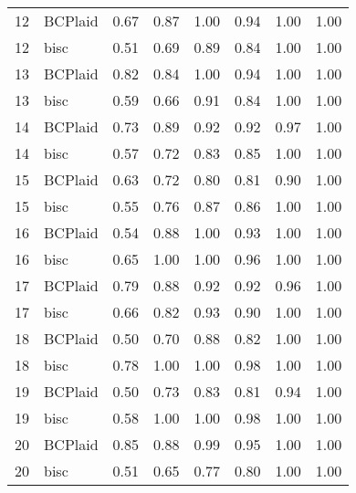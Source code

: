 \begin{table}[ht]
\begin{tabular}{rlrrrrrr}
   12 & BCPlaid & 0.67 & 0.87 & 1.00 & 0.94 & 1.00 & 1.00 \\ 
   12 & bisc & 0.51 & 0.69 & 0.89 & 0.84 & 1.00 & 1.00 \\ 
   13 & BCPlaid & 0.82 & 0.84 & 1.00 & 0.94 & 1.00 & 1.00 \\ 
   13 & bisc & 0.59 & 0.66 & 0.91 & 0.84 & 1.00 & 1.00 \\ 
   14 & BCPlaid & 0.73 & 0.89 & 0.92 & 0.92 & 0.97 & 1.00 \\ 
   14 & bisc & 0.57 & 0.72 & 0.83 & 0.85 & 1.00 & 1.00 \\ 
   15 & BCPlaid & 0.63 & 0.72 & 0.80 & 0.81 & 0.90 & 1.00 \\ 
   15 & bisc & 0.55 & 0.76 & 0.87 & 0.86 & 1.00 & 1.00 \\ 
   16 & BCPlaid & 0.54 & 0.88 & 1.00 & 0.93 & 1.00 & 1.00 \\ 
   16 & bisc & 0.65 & 1.00 & 1.00 & 0.96 & 1.00 & 1.00 \\ 
   17 & BCPlaid & 0.79 & 0.88 & 0.92 & 0.92 & 0.96 & 1.00 \\ 
   17 & bisc & 0.66 & 0.82 & 0.93 & 0.90 & 1.00 & 1.00 \\ 
   18 & BCPlaid & 0.50 & 0.70 & 0.88 & 0.82 & 1.00 & 1.00 \\ 
   18 & bisc & 0.78 & 1.00 & 1.00 & 0.98 & 1.00 & 1.00 \\ 
   19 & BCPlaid & 0.50 & 0.73 & 0.83 & 0.81 & 0.94 & 1.00 \\ 
   19 & bisc & 0.58 & 1.00 & 1.00 & 0.98 & 1.00 & 1.00 \\ 
   20 & BCPlaid & 0.85 & 0.88 & 0.99 & 0.95 & 1.00 & 1.00 \\ 
   20 & bisc & 0.51 & 0.65 & 0.77 & 0.80 & 1.00 & 1.00 \\ 
   \bottomrule
\end{tabular}
\end{table}

